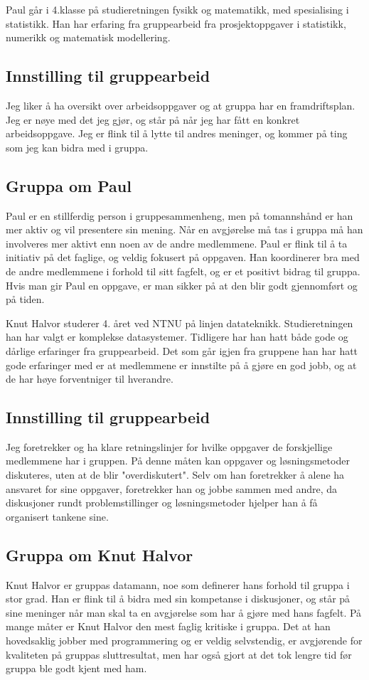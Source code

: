 Paul går i 4.klasse på studieretningen fysikk og matematikk, med spesialising i statistikk. Han har erfaring fra gruppearbeid fra prosjektoppgaver i statistikk, numerikk og matematisk modellering.

\subsection*{Innstilling til gruppearbeid}
Jeg liker å ha oversikt over arbeidsoppgaver og at gruppa har en framdriftsplan. Jeg er nøye med det jeg gjør, og står på når jeg har fått en konkret arbeidsoppgave. Jeg er flink til å lytte til andres meninger, og kommer på ting som jeg kan bidra med i gruppa.

\subsection*{Gruppa om Paul}
Paul er en stillferdig person i gruppesammenheng, men på tomannshånd er han mer
aktiv og vil presentere sin mening. Når en avgjørelse må tas i gruppa må han
involveres mer aktivt enn noen av de andre medlemmene. Paul er flink til å ta 
initiativ på det faglige, og veldig fokusert på oppgaven. Han koordinerer bra 
med de andre medlemmene i forhold til sitt fagfelt, og er et positivt bidrag til
gruppa. Hvis man gir Paul en oppgave, er man sikker på at den blir godt
gjennomført og på tiden.

Knut Halvor studerer 4. året ved NTNU på linjen datateknikk. Studieretningen han 
har valgt er komplekse datasystemer. Tidligere har han hatt både gode og dårlige
erfaringer fra gruppearbeid. Det som går igjen fra gruppene han har hatt gode
erfaringer med er at medlemmene er innstilte på å gjøre en god jobb, og at de
har høye forventniger til hverandre.

\subsection*{Innstilling til gruppearbeid}
Jeg foretrekker og ha klare retningslinjer for hvilke oppgaver de forskjellige 
medlemmene har i gruppen. På denne måten kan oppgaver og løsningsmetoder diskuteres,
uten at de blir "overdiskutert". Selv om han foretrekker å alene ha ansvaret for sine oppgaver,
foretrekker han og jobbe sammen med andre, da diskusjoner rundt problemstillinger og
løsningsmetoder hjelper han å få organisert tankene sine.

\subsection*{Gruppa om Knut Halvor}
Knut Halvor er gruppas datamann, noe som definerer hans forhold til gruppa i
stor grad. Han er flink til å bidra med sin kompetanse i diskusjoner, og står på
sine meninger når man skal ta en avgjørelse som har å gjøre med hans fagfelt. På
mange måter er Knut Halvor den mest faglig kritiske i gruppa. Det at han hovedsaklig
jobber med programmering og er veldig selvstendig, er avgjørende for kvaliteten på 
gruppas sluttresultat, men har også gjort at det tok lengre tid før gruppa ble godt 
kjent med ham.

